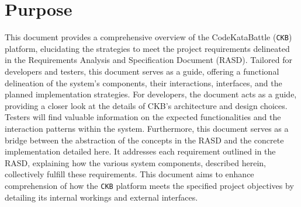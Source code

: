 \section{Purpose}
\label{sec:purpose}
This document provides a comprehensive overview of the CodeKataBattle (\verb|CKB|) platform, elucidating the strategies to meet the project requirements delineated in the Requirements Analysis and Specification Document (RASD). 
Tailored for developers and testers, this document serves as a guide, offering a functional delineation of the system's components, their interactions, interfaces, and the planned implementation strategies.
For developers, the document acts as a guide, providing a closer look at the details of CKB's architecture and design choices.
Testers will find valuable information on the expected functionalities and the interaction patterns within the system.
Furthermore, this document serves as a bridge between the abstraction of the concepts in the RASD and the concrete implementation detailed here. 
It addresses each requirement outlined in the RASD, explaining how the various system components, described herein, collectively fulfill these requirements. 
This document aims to enhance comprehension of how the \verb|CKB| platform meets the specified project objectives by detailing its internal workings and external interfaces.